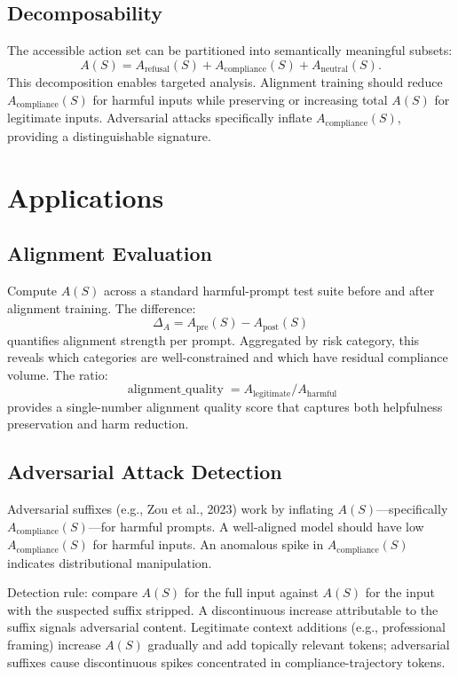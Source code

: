 \documentclass[11pt,letterpaper]{article}
\begin{document}
\subsection{Decomposability}
The accessible action set can be partitioned into semantically meaningful subsets:
\begin{equation}
A(S)=A_{\mathrm{refusal}}(S)+A_{\mathrm{compliance}}(S)+A_{\mathrm{neutral}}(S).
\end{equation}
This decomposition enables targeted analysis. Alignment training should reduce $A_{\mathrm{compliance}}(S)$ for harmful inputs while preserving or increasing total $A(S)$ for legitimate inputs. Adversarial attacks specifically inflate $A_{\mathrm{compliance}}(S)$, providing a distinguishable signature.

\section{Applications}
\subsection{Alignment Evaluation}
Compute $A(S)$ across a standard harmful-prompt test suite before and after alignment training. The difference:
\begin{equation}
\Delta_A=A_{\mathrm{pre}}(S)-A_{\mathrm{post}}(S)
\end{equation}
quantifies alignment strength per prompt. Aggregated by risk category, this reveals which categories are well-constrained and which have residual compliance volume. The ratio:
\begin{equation}
\operatorname{alignment\_quality}=A_{\mathrm{legitimate}}/A_{\mathrm{harmful}}
\end{equation}
provides a single-number alignment quality score that captures both helpfulness preservation and harm reduction.

\subsection{Adversarial Attack Detection}
Adversarial suffixes (e.g., Zou et al., 2023) work by inflating $A(S)$---specifically $A_{\mathrm{compliance}}(S)$---for harmful prompts. A well-aligned model should have low $A_{\mathrm{compliance}}(S)$ for harmful inputs. An anomalous spike in $A_{\mathrm{compliance}}(S)$ indicates distributional manipulation.

Detection rule: compare $A(S)$ for the full input against $A(S)$ for the input with the suspected suffix stripped. A discontinuous increase attributable to the suffix signals adversarial content. Legitimate context additions (e.g., professional framing) increase $A(S)$ gradually and add topically relevant tokens; adversarial suffixes cause discontinuous spikes concentrated in compliance-trajectory tokens.
\end{document}
